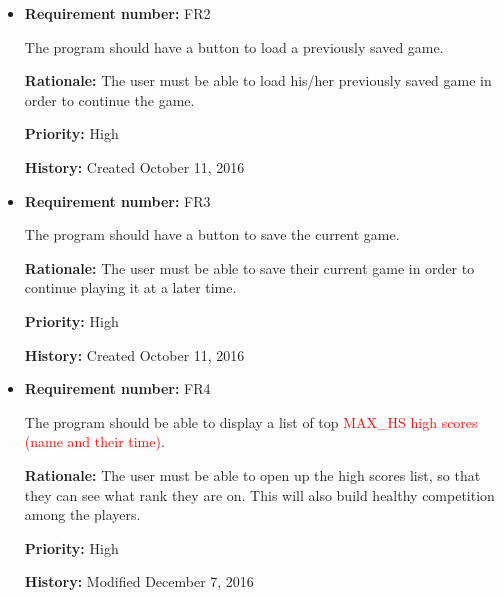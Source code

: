 \documentclass[12pt,letterpaper]{article}
\begin{document}
\begin{reqbox}
	\begin{itemize}

		\item \textbf{Requirement number: }FR2  
		
		 The program should have a button to load a previously saved game.

		\textbf{Rationale: }The user must be able to load his/her previously saved game in order to continue the game.

		\textbf{Priority: }High

		\textbf{History: }Created October 11, 2016
	\end{itemize}
\end{reqbox}

\begin{reqbox}
	\begin{itemize}

		\item \textbf{Requirement number: }FR3

		The program should have a button to save the current game.

		\textbf{Rationale: }The user must be able to save their current game in order to continue playing it at a later time.

		\textbf{Priority: }High

		\textbf{History: }Created October 11, 2016

	\end{itemize}
\end{reqbox}

\begin{reqbox}
	\begin{itemize}

		\item \textbf{Requirement number: }FR4

		The program should be able to display a list of top \textcolor{red}{MAX_HS high scores (name and their time)}. 

		\textbf{Rationale: }The user must be able to open up the high scores list, so that they can see what rank they are on. This will also build healthy competition among the players.

		\textbf{Priority: }High

		\textbf{History: }Modified December 7, 2016

	\end{itemize}
\end{reqbox}
\end{document}
